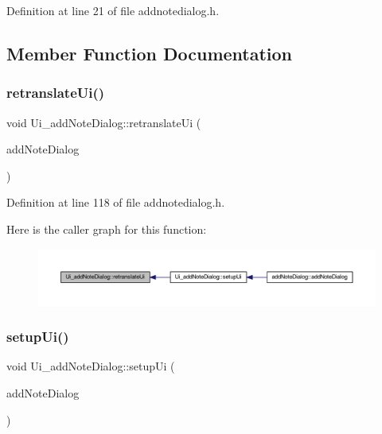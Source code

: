 Definition at line 21 of file addnotedialog.\+h.



\subsection{Member Function Documentation}
\hypertarget{classUi__addNoteDialog_aab12c63dbd7ceae65cefd5be2a09c2ab}{}\label{classUi__addNoteDialog_aab12c63dbd7ceae65cefd5be2a09c2ab} 
\subsubsection{\texorpdfstring{retranslate\+Ui()}{retranslateUi()}}
{\footnotesize\ttfamily void Ui\+\_\+add\+Note\+Dialog\+::retranslate\+Ui (\begin{DoxyParamCaption}\item[{Q\+Widget $\ast$}]{add\+Note\+Dialog }\end{DoxyParamCaption})\hspace{0.3cm}{\ttfamily [inline]}}



Definition at line 118 of file addnotedialog.\+h.

Here is the caller graph for this function\+:
\nopagebreak
\begin{figure}[H]
\begin{center}
\leavevmode
\includegraphics[width=350pt]{classUi__addNoteDialog_aab12c63dbd7ceae65cefd5be2a09c2ab_icgraph}
\end{center}
\end{figure}
\hypertarget{classUi__addNoteDialog_a2487f1cd1542da959f06b7412e80ef0b}{}\label{classUi__addNoteDialog_a2487f1cd1542da959f06b7412e80ef0b} 
\subsubsection{\texorpdfstring{setup\+Ui()}{setupUi()}}
{\footnotesize\ttfamily void Ui\+\_\+add\+Note\+Dialog\+::setup\+Ui (\begin{DoxyParamCaption}\item[{Q\+Widget $\ast$}]{add\+Note\+Dialog }\end{DoxyParamCaption})\hspace{0.3cm}{\ttfamily [inline]}}



